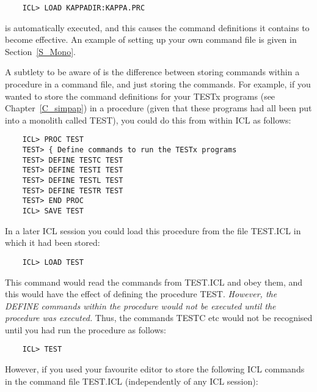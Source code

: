 \begin{small}
\begin{verbatim}
    ICL> LOAD KAPPADIR:KAPPA.PRC
\end{verbatim}
\end{small}

is automatically executed, and this causes the command definitions it
contains to become effective.
An example of setting up your own command file is given in Section~\ref{S_Mono}.

A subtlety to be aware of is the difference between storing commands within
a procedure in a command file, and just storing the commands.
For example, if you wanted to store the command definitions for your TESTx
programs (see Chapter~\ref{C_simpap}) in a procedure (given that these programs
had all been put into a monolith called TEST), you could do this from within ICL
as follows:

\begin{small}
\begin{verbatim}
    ICL> PROC TEST
    TEST> { Define commands to run the TESTx programs
    TEST> DEFINE TESTC TEST
    TEST> DEFINE TESTI TEST
    TEST> DEFINE TESTL TEST
    TEST> DEFINE TESTR TEST
    TEST> END PROC
    ICL> SAVE TEST
\end{verbatim}
\end{small}

In a later ICL session you could load this procedure from the file TEST.ICL
in which it had been stored:

\begin{small}
\begin{verbatim}
    ICL> LOAD TEST
\end{verbatim}
\end{small}

This command would read the commands from TEST.ICL and obey them, and this
would have the effect of defining the procedure TEST.
{\em However, the DEFINE commands within the procedure would not be
executed until the procedure was executed.}
Thus, the commands TESTC etc would not be recognised until you had run the
procedure as follows:

\begin{small}
\begin{verbatim}
    ICL> TEST
\end{verbatim}
\end{small}

However, if you used your favourite editor to store the following ICL commands
in the command file TEST.ICL (independently of any ICL session):

